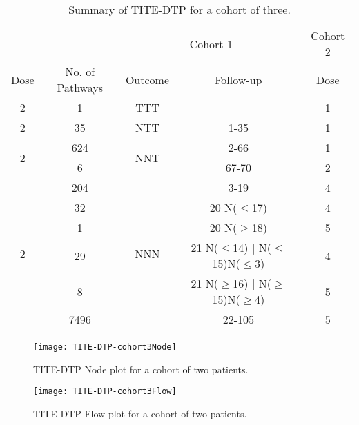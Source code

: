 \begin{table}[h!]
	\centering
	\caption{Summary of TITE-DTP for a cohort of three.}
	\label{tab_tite-dtp:TITEDTP_c3_Sum}
	\begin{tabular}{ccccc}
		\toprule
		\multicolumn{1}{l}{} & 				   &\multicolumn{2}{c}{Cohort 1}                       & Cohort 2 \\ 
		\cmidrule(l{3pt}r{3pt}){3-4} \cmidrule(l{3pt}r{3pt}){5-5}
		Dose                 & No. of Pathways & Outcome              & Follow-up & Dose     \\ \hline
		2                    & 1               & TTT                  &           & 1        \\ \hline
		2                    & 35              & NTT                  & 1-35      & 1        \\ \hline
		\multirow{2}{*}{2}   & 624             & \multirow{2}{*}{NNT} & 2-66      & 1        \\
		& 6               &                      & 67-70     & 2        \\ \hline
		\multirow{6}{*}{2}   & 204             & \multirow{6}{*}{NNN} & 3-19      & 4        \\
		& 32              &                      & 20 N($\leq$17)    & 4        \\
		& 1               &                      & 20 N($\geq$18)    & 5        \\
		& 29              &                      & 21 N($\leq$14) | N($\leq$15)N($\leq$3)    & 4        \\
		& 8               &                      & 21 N($\geq$16) | N($\geq$15)N($\geq$4)    & 5        \\
		& 7496            &                      & 22-105    & 5        \\ 
		\bottomrule
	\end{tabular}
\end{table}

\begin{figure}[h!]
	\centering
	\caption{TITE-DTP Node plot for a cohort of two patients.}
	\label{fig_tite-dtp:TITEDTP-cohort3-node}
	\texttt{[image: TITE-DTP-cohort3Node]}
\end{figure}

\clearpage

\begin{figure}[h!]
	\centering
	\caption{TITE-DTP Flow plot for a cohort of two patients.}
	\label{fig_tite-dtp:TITEDTP-cohort3-flow}
	\texttt{[image: TITE-DTP-cohort3Flow]}
\end{figure}

